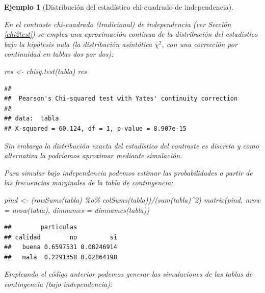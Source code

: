 \documentclass[
]{book}
\newenvironment{Shaded}{\begin{snugshade}}{\end{snugshade}}
\newcommand{\AttributeTok}[1]{\textcolor[rgb]{0.77,0.63,0.00}{#1}}
\newcommand{\DecValTok}[1]{\textcolor[rgb]{0.00,0.00,0.81}{#1}}
\newcommand{\FunctionTok}[1]{\textcolor[rgb]{0.00,0.00,0.00}{#1}}
\newcommand{\NormalTok}[1]{#1}
\newcommand{\OtherTok}[1]{\textcolor[rgb]{0.56,0.35,0.01}{#1}}
\newcommand{\SpecialCharTok}[1]{\textcolor[rgb]{0.00,0.00,0.00}{#1}}
\theoremstyle{break}
\newtheorem{example}{Ejemplo}[chapter]
\theoremstyle{nonumberplain}
\begin{document}
\begin{example}[Distribución del estadístico chi-cuadrado de independencia]
\protect\hypertarget{exm:chicuadind}{}\label{exm:chicuadind}

En el contraste chi-cuadrado (tradicional) de independencia (ver Sección \ref{chi2test}) se emplea una aproximación continua de la distribución del estadístico bajo la hipótesis nula (la distribución asintótica \(\chi^2\), con una corrección por continuidad en tablas dos por dos):

\begin{Shaded}
\begin{Highlighting}[]
\NormalTok{res }\OtherTok{\textless{}{-}} \FunctionTok{chisq.test}\NormalTok{(tabla)}
\NormalTok{res}
\end{Highlighting}
\end{Shaded}

\begin{verbatim}
## 
##  Pearson's Chi-squared test with Yates' continuity correction
## 
## data:  tabla
## X-squared = 60.124, df = 1, p-value = 8.907e-15
\end{verbatim}

Sin embargo la distribución exacta del estadístico del contraste es discreta y como alternativa la podríamos aproximar mediante simulación.

Para simular bajo independencia podemos estimar las probabilidades a partir de las frecuencias marginales de la tabla de contingencia:

\begin{Shaded}
\begin{Highlighting}[]
\NormalTok{pind }\OtherTok{\textless{}{-}}\NormalTok{ (}\FunctionTok{rowSums}\NormalTok{(tabla) }\SpecialCharTok{\%o\%} \FunctionTok{colSums}\NormalTok{(tabla))}\SpecialCharTok{/}\NormalTok{(}\FunctionTok{sum}\NormalTok{(tabla)}\SpecialCharTok{\^{}}\DecValTok{2}\NormalTok{)}
\FunctionTok{matrix}\NormalTok{(pind, }\AttributeTok{nrow =} \FunctionTok{nrow}\NormalTok{(tabla), }\AttributeTok{dimnames =} \FunctionTok{dimnames}\NormalTok{(tabla))}
\end{Highlighting}
\end{Shaded}

\begin{verbatim}
##        particulas
## calidad        no         si
##   buena 0.6597531 0.08246914
##   mala  0.2291358 0.02864198
\end{verbatim}

Empleando el código anterior podemos generar las simulaciones de las tablas de contingencia (bajo independencia):


\end{example}
\end{document}
